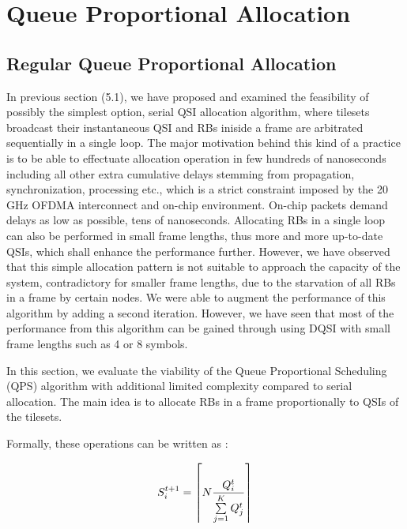 \section{Queue Proportional Allocation}

\subsection{Regular Queue Proportional Allocation}

In previous section (5.1), we have proposed and examined the feasibility of possibly the simplest option, serial QSI allocation algorithm, where tilesets broadcast their instantaneous QSI and RBs iniside a frame are arbitrated sequentially in a single loop. The major motivation behind this kind of a practice is to be able to effectuate allocation operation in few hundreds of nanoseconds including all other extra cumulative delays stemming from propagation, synchronization, processing etc., which is a strict constraint imposed by the 20 GHz OFDMA interconnect and on-chip environment. On-chip packets demand delays as low as possible, tens of nanoseconds. Allocating RBs in a single loop can also be performed in small frame lengths, thus more and more up-to-date QSIs, which shall enhance the performance further. However, we have observed that this simple allocation pattern is not suitable to approach the capacity of the system, contradictory for smaller frame lengths, due to the starvation of all RBs in a frame by certain nodes. We were able to augment the performance of this algorithm by adding a second iteration. However, we have seen that most of the performance from this algorithm can be gained through using DQSI with small frame lengths such as 4 or 8 symbols. 


In this section, we evaluate the viability of the Queue Proportional Scheduling (QPS) algorithm with additional limited complexity compared to serial allocation. The main idea is to allocate RBs in a frame proportionally to QSIs of the tilesets. 

Formally, these operations can be written as :

\begin{align}
S_{i}^{t+1} = \left\lceil N{{Q}_{i}^{t} \over \sum\limits_{j=1}^K {Q}_{j}^{t}}\right\rceil
\end{align} 

